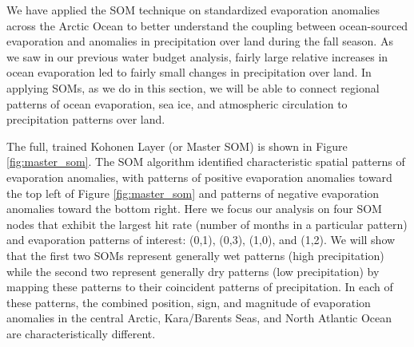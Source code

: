 
We have applied the SOM technique on standardized evaporation anomalies across the Arctic Ocean to better understand the coupling between ocean-sourced evaporation and anomalies in precipitation over land during the fall season.
As we saw in our previous water budget analysis, fairly large relative increases in ocean evaporation led to fairly small changes in precipitation over land.
In applying SOMs, as we do in this section, we will be able to connect regional patterns of ocean evaporation, sea ice, and atmospheric circulation to precipitation patterns over land.

The full, trained Kohonen Layer (or Master SOM) is shown in Figure \ref{fig:master_som}.
The SOM algorithm identified characteristic spatial patterns of evaporation anomalies, with patterns of positive evaporation anomalies toward the top left of Figure \ref{fig:master_som} and patterns of negative evaporation anomalies toward the bottom right.
Here we focus our analysis on four SOM nodes that exhibit the largest hit rate (number of months in a particular pattern) and evaporation patterns of interest: (0,1), (0,3), (1,0), and (1,2).
We will show that the first two SOMs represent generally wet patterns (high precipitation) while the second two represent generally dry patterns (low precipitation) by mapping these patterns to their coincident patterns of precipitation.
In each of these patterns, the combined position, sign, and magnitude of evaporation anomalies in the central Arctic, Kara/Barents Seas, and North Atlantic Ocean are characteristically different.

